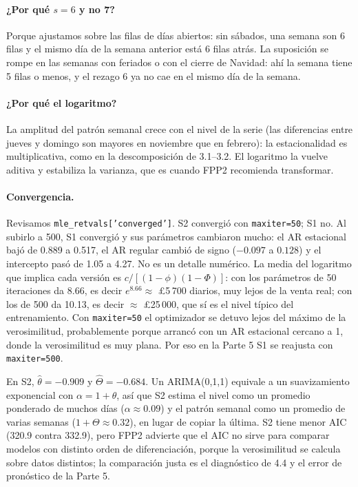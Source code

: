 \documentclass[11pt]{article}
\begin{document}
\paragraph{¿Por qué $s=6$ y no 7?} Porque ajustamos sobre las filas de días abiertos: sin sábados, una semana son 6
filas y el mismo día de la semana anterior está 6 filas atrás. La suposición se rompe en las semanas con feriados o
con el cierre de Navidad: ahí la semana tiene 5 filas o menos, y el rezago 6 ya no cae en el mismo día de la semana.

\paragraph{¿Por qué el logaritmo?} La amplitud del patrón semanal crece con el nivel de la serie (las diferencias
entre jueves y domingo son mayores en noviembre que en febrero): la estacionalidad es multiplicativa, como en la
descomposición de 3.1--3.2. El logaritmo la vuelve aditiva y estabiliza la varianza, que es cuando FPP2 recomienda
transformar. \paragraph{Convergencia.} Revisamos \texttt{mle\_retvals['converged']}. S2 convergió con \texttt{maxiter=50};
S1 no. Al subirlo a 500, S1 convergió y sus parámetros cambiaron mucho: el AR estacional bajó de 0.889 a 0.517, el AR
regular cambió de signo ($-0.097$ a $0.128$) y el intercepto pasó de 1.05 a 4.27. No es un detalle numérico. La media
del logaritmo que implica cada versión es $c/[(1-\phi)(1-\Phi)]$: con los parámetros de 50 iteraciones da 8.66, es
decir $e^{8.66}\approx$ £5\,700 diarios, muy lejos de la venta real; con los de 500 da 10.13, es decir
$\approx$ £25\,000, que sí es el nivel típico del entrenamiento. Con \texttt{maxiter=50} el optimizador se detuvo
lejos del máximo de la verosimilitud, probablemente porque arrancó con un AR estacional cercano a 1, donde la
verosimilitud es muy plana. Por eso en la Parte 5 S1 se reajusta con \texttt{maxiter=500}.

En S2, $\hat\theta=-0.909$ y $\hat\Theta=-0.684$. Un ARIMA(0,1,1) equivale a un suavizamiento exponencial con
$\alpha=1+\theta$, así que S2 estima el nivel como un promedio ponderado de muchos días ($\alpha\approx0.09$) y el
patrón semanal como un promedio de varias semanas ($1+\Theta\approx0.32$), en lugar de copiar la última. S2 tiene
menor AIC (320.9 contra 332.9), pero FPP2 advierte que el AIC no sirve para comparar modelos con distinto orden de
diferenciación, porque la verosimilitud se calcula sobre datos distintos; la comparación justa es el diagnóstico de
4.4 y el error de pronóstico de la Parte 5.
\end{document}
